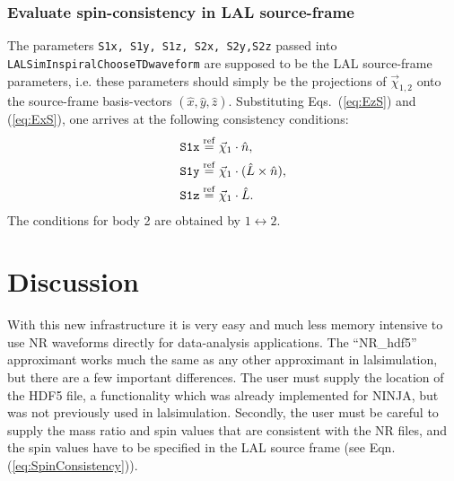 \documentclass[11pt,tightenlines,article,amssymb,amsmath,amsfonts,superscriptaddress]{revtex4}
\newcommand{\nNR}{\hat{n}}
\newcommand{\lNR}{\hat L}
\newcommand{\ExS}{{{\hat x}}}
\newcommand{\EyS}{{{\hat y}}}
\newcommand{\EzS}{{{\hat z}}}
\newcommand{\equalref}{\overset{\rm ref}{=}}
\begin{document}
\subsubsection{Evaluate spin-consistency in LAL source-frame}

The parameters {\tt S1x, S1y, S1z, S2x, S2y,S2z} passed into {\tt
  LALSimInspiralChooseTDwaveform} are supposed to be the LAL
source-frame parameters, i.e. these parameters should simply be the
projections of $\vec\chi_{1,2}$ onto the source-frame basis-vectors
$(\ExS,\EyS,\EzS)$.  Substituting Eqs.~(\ref{eq:EzS}) and (\ref{eq:ExS}),
one arrives at the following consistency conditions:
\begin{subequations}
\label{eq:SpinConsistency}
  \begin{align}
    \mbox{\tt S1x} &  \equalref \vec\chi_1 \cdot \nNR,\\
    \mbox{\tt S1y} &  \equalref \vec\chi_1\cdot (\lNR\times\nNR),\\
    \mbox{\tt S1z} &  \equalref \vec\chi_1 \cdot \lNR.
  \end{align}
\end{subequations}
The conditions for body 2 are obtained by $1\leftrightarrow 2$.\\


\section{Discussion}
\label{sec:discussion}

With this new infrastructure it is very easy and much less memory intensive to use NR waveforms
directly for data-analysis applications. The ``NR\_hdf5'' approximant works much the same as any other approximant
in lalsimulation, but there are a few important differences.
The user must supply the location of the HDF5 file, a functionality which was already implemented for NINJA, but was not
previously used in lalsimulation. Secondly, the user must be careful to supply the mass ratio and spin values that
are consistent with the NR files, and the spin values have to be specified in the LAL source frame (see Eqn. (\ref{eq:SpinConsistency})). \\
\end{document}
